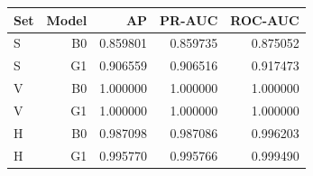 \begin{tabular}{lrrrr}
\toprule
Set & Model & AP & PR-AUC & ROC-AUC \\
\midrule
S & B0 & 0.859801 & 0.859735 & 0.875052 \\
S & G1 & 0.906559 & 0.906516 & 0.917473 \\
V & B0 & 1.000000 & 1.000000 & 1.000000 \\
V & G1 & 1.000000 & 1.000000 & 1.000000 \\
H & B0 & 0.987098 & 0.987086 & 0.996203 \\
H & G1 & 0.995770 & 0.995766 & 0.999490 \\
\bottomrule
\end{tabular}
